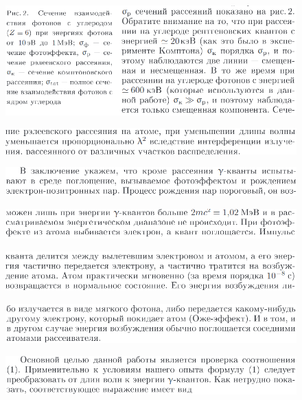 \documentclass{article}
\theoremstyle{remark}
\begin{document}
\begin{figure}[htp]
    \includegraphics[width=1.2\linewidth]{22.png}
\end{figure}
\begin{figure}[htp]
    \includegraphics[width=1.2\linewidth]{23.png}
\end{figure}
\begin{figure}[htp]
    \includegraphics[width=1.2\linewidth]{24.png}
\end{figure}
\begin{figure}[htp]
    \includegraphics[width=1.2\linewidth]{25.png}
\end{figure}
\begin{figure}[htp]
    \includegraphics[width=1.2\linewidth]{26.png}
\end{figure}
\begin{figure}[htp]
    \includegraphics[width=1.2\linewidth]{27.png}
\end{figure}
\begin{figure}[htp]
    \includegraphics[width=1.2\linewidth]{28.png}
\end{figure}
\end{document}
